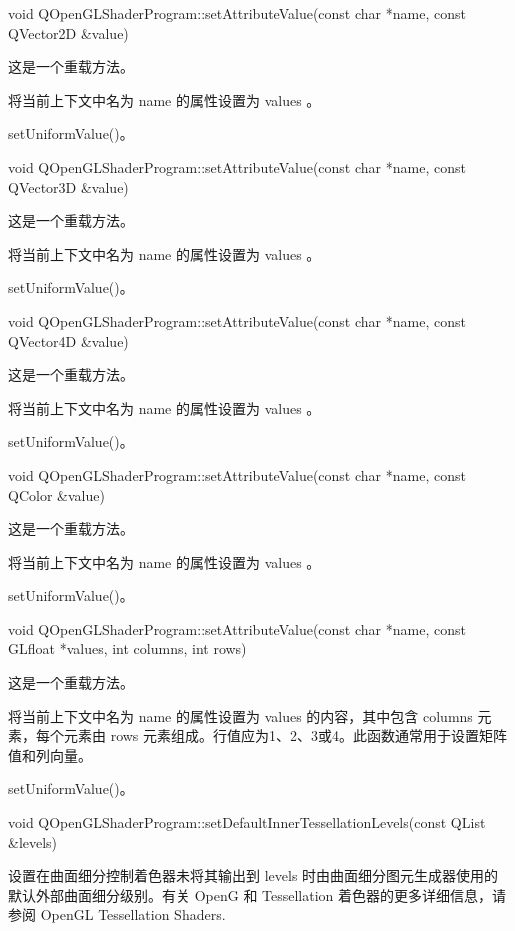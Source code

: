 void QOpenGLShaderProgram::setAttributeValue(const char *name, const QVector2D \&value)

这是一个重载方法。

将当前上下文中名为 name 的属性设置为 values 。


\begin{seeAlso}
setUniformValue()。
\end{seeAlso}

void QOpenGLShaderProgram::setAttributeValue(const char *name, const QVector3D \&value)

这是一个重载方法。

将当前上下文中名为 name 的属性设置为 values 。


\begin{seeAlso}
setUniformValue()。
\end{seeAlso}

void QOpenGLShaderProgram::setAttributeValue(const char *name, const QVector4D \&value)

这是一个重载方法。

将当前上下文中名为 name 的属性设置为 values 。


\begin{seeAlso}
setUniformValue()。
\end{seeAlso}

void QOpenGLShaderProgram::setAttributeValue(const char *name, const QColor \&value)

这是一个重载方法。

将当前上下文中名为 name 的属性设置为 values 。


\begin{seeAlso}
setUniformValue()。
\end{seeAlso}

void QOpenGLShaderProgram::setAttributeValue(const char *name, const GLfloat *values, int columns, int rows)

这是一个重载方法。

将当前上下文中名为 name 的属性设置为 values 的内容，其中包含 columns 元素，每个元素由 rows 元素组成。行值应为1、2、3或4。此函数通常用于设置矩阵值和列向量。


\begin{seeAlso}
setUniformValue()。
\end{seeAlso}

void QOpenGLShaderProgram::setDefaultInnerTessellationLevels(const QList \&levels)

设置在曲面细分控制着色器未将其输出到 levels 时由曲面细分图元生成器使用的默认外部曲面细分级别。有关 OpenG 和 Tessellation 着色器的更多详细信息，请参阅 OpenGL Tessellation Shaders.


